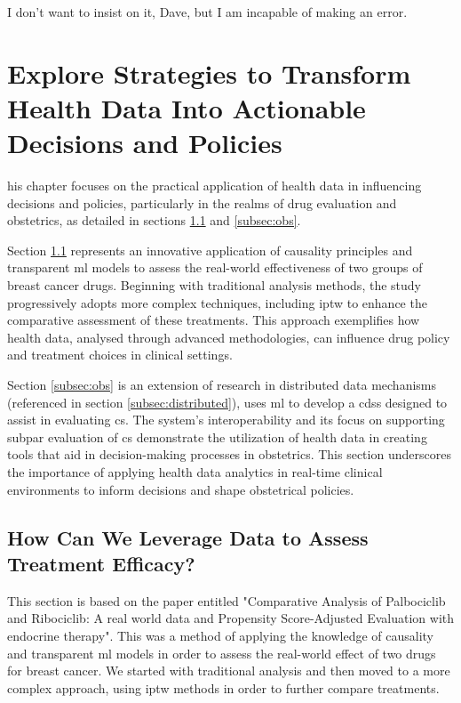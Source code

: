 
\begin{savequote}[65mm]
    I don't want to insist on it, Dave, but I am incapable of making an error.
    \end{savequote}
    
\chapter{Explore Strategies to Transform Health Data Into Actionable Decisions and Policies}\label{chap:goal3}

his chapter focuses on the practical application of health data in influencing decisions and policies, particularly in the realms of drug evaluation and obstetrics, as detailed in sections \ref{subsec:ipop} and \ref{subsec:obs}.

Section \ref{subsec:ipop} represents an innovative application of causality principles and transparent \ac{ml} models to assess the real-world effectiveness of two groups of breast cancer drugs. Beginning with traditional analysis methods, the study progressively adopts more complex techniques, including \ac{iptw} to enhance the comparative assessment of these treatments. This approach exemplifies how health data, analysed through advanced methodologies, can influence drug policy and treatment choices in clinical settings.

Section \ref{subsec:obs} is an extension of research in distributed data mechanisms (referenced in section \ref{subsec:distributed}), uses \ac{ml} to develop a \ac{cdss} designed to assist in evaluating \ac{cs}. The system's interoperability and its focus on supporting subpar evaluation of \ac{cs} demonstrate the utilization of health data in creating tools that aid in decision-making processes in obstetrics. This section underscores the importance of applying health data analytics in real-time clinical environments to inform decisions and shape obstetrical policies.



\section{How Can We Leverage Data to Assess Treatment Efficacy?}\label{subsec:ipop}
This section is based on the paper entitled "Comparative Analysis of Palbociclib and Ribociclib: A real world data and Propensity Score-Adjusted Evaluation with endocrine therapy". This was a method of applying the knowledge of causality and transparent \ac{ml} models in order to assess the real-world effect of two drugs for breast cancer. We started with traditional analysis and then moved to a more complex approach, using \ac{iptw} methods in order to further compare treatments.
    
